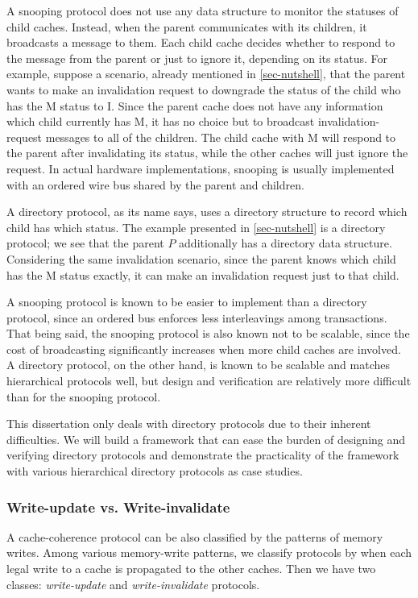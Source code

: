 A snooping protocol does not use any data structure to monitor the statuses of child caches.
Instead, when the parent communicates with its children, it broadcasts a message to them.
Each child cache decides whether to respond to the message from the parent or just to ignore it, depending on its status.
For example, suppose a scenario, already mentioned in \autoref{sec-nutshell}, that the parent wants to make an invalidation request to downgrade the status of the child who has the M status to I.
Since the parent cache does not have any information which child currently has M, it has no choice but to broadcast invalidation-request messages to all of the children.
The child cache with M will respond to the parent after invalidating its status, while the other caches will just ignore the request.
In actual hardware implementations, snooping is usually implemented with an ordered wire bus shared by the parent and children.

A directory protocol, as its name says, uses a directory structure to record which child has which status.
The example presented in \autoref{sec-nutshell} is a directory protocol; we see that the parent $P$ additionally has a directory data structure.
Considering the same invalidation scenario, since the parent knows which child has the M status exactly, it can make an invalidation request just to that child.

A snooping protocol is known to be easier to implement than a directory protocol, since an ordered bus enforces less interleavings among transactions.
That being said, the snooping protocol is also known not to be scalable, since the cost of broadcasting significantly increases when more child caches are involved.
A directory protocol, on the other hand, is known to be scalable and matches hierarchical protocols well, but design and verification are relatively more difficult than for the snooping protocol.

This dissertation only deals with directory protocols due to their inherent difficulties.
We will build a framework that can ease the burden of designing and verifying directory protocols and demonstrate the practicality of the framework with various hierarchical directory protocols as case studies.

\subsubsection{Write-update vs. Write-invalidate}

A cache-coherence protocol can be also classified by the patterns of memory writes.
Among various memory-write patterns, we classify protocols by when each legal write to a cache is propagated to the other caches.
Then we have two classes: \emph{write-update} and \emph{write-invalidate} protocols.

